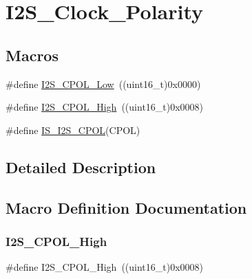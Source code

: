 \hypertarget{group___i2_s___clock___polarity}{}\section{I2\+S\+\_\+\+Clock\+\_\+\+Polarity}
\label{group___i2_s___clock___polarity}
\subsection*{Macros}
\begin{DoxyCompactItemize}
\item 
\#define \mbox{\hyperlink{group___i2_s___clock___polarity_gae859a63575e4af3e007fc5123fa901ab}{I2\+S\+\_\+\+C\+P\+O\+L\+\_\+\+Low}}~((uint16\+\_\+t)0x0000)
\item 
\#define \mbox{\hyperlink{group___i2_s___clock___polarity_gae26f7f9fbde299fbdc0b81a2cc38bfdb}{I2\+S\+\_\+\+C\+P\+O\+L\+\_\+\+High}}~((uint16\+\_\+t)0x0008)
\item 
\#define \mbox{\hyperlink{group___i2_s___clock___polarity_ga6323375bf0b6fa6e2ee2a9ce6f9ef82f}{I\+S\+\_\+\+I2\+S\+\_\+\+C\+P\+OL}}(C\+P\+OL)
\end{DoxyCompactItemize}


\subsection{Detailed Description}


\subsection{Macro Definition Documentation}
\mbox{\label{group___i2_s___clock___polarity_gae26f7f9fbde299fbdc0b81a2cc38bfdb}} 
\subsubsection{\texorpdfstring{I2S\_CPOL\_High}{I2S\_CPOL\_High}}
{\footnotesize\ttfamily \#define I2\+S\+\_\+\+C\+P\+O\+L\+\_\+\+High~((uint16\+\_\+t)0x0008)}

\mbox{\label{group___i2_s___clock___polarity_gae859a63575e4af3e007fc5123fa901ab}} 

